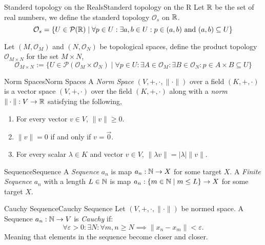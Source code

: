 \documentclass{article}
\newcommand{\tp}{\mathcal{O}}
\newcommand{\pset}[1]{\mathcal{P}(#1)}
\begin{document}
\begin{example}{Standerd topology on the Reals}{Standerd topology on the R}
    Let $\mathbb{R}$ be the set of real numbers, we define the standerd topology $\tp_s$ on $\mathbb{R}$.
    $$\tp_s = \{U \in \pset{\R} \mid \forall p  \in U : \exists a, b \in U : p \in (a,b) \tand (a,b) \subseteq U\}$$
\end{example}

\begin{definition}{}{}
    Let $(M, \tp_M)$ and $(N, \tp_N)$ be topological spaces, define the product topology $\tp_{M \times N}$ for the set $M \times N$,
    $$\tp_{M \times N}  := \{U \in \pset{\tp_M \times \tp_N} \mid \forall p \in U : \exists A \in \tp_M : \exists B \in \tp_N : p \in A \times B \subseteq U\}$$
\end{definition}



\begin{definition}{Norm Spaces}{Norm Spaces}
    A \emph{Norm Space} $\left(V, +, \cdot, \|\cdot\|\right)$ over a field $\left(K, +, \cdot\right)$
    is a vector space $\left(V, +, \cdot\right)$ over the field $\left(K, +, \cdot\right)$ along with a \emph{norm} $\|\cdot\| : V \to \mathbb{R}$  satisfying the following,

    \begin{enumerate}[label=(\roman*)]
        \item For every vector $v \in V$, $\|v\| \geq 0$.
        \item $\|v\| = 0$ if and only if $v = \vec{0}$.
        \item For every scalar $\lambda \in K$ and vector $v \in V$, $\|\lambda v\| = |\lambda|\|v\|$.
    \end{enumerate}
\end{definition}

\begin{definition}{Sequence}{Sequence}
    A \emph{Sequence} $a_n$ is map $a_n : \mathbb{N} \to X$ for some target $X$.
    A \emph{Finite Sequence} $a_n$ with a length $L \in \mathbb{N}$ is map $a_n : \{m \in \mathbb{N} \mid m \leq L\} \to X$ for some target $X$.
\end{definition}

\begin{definition}{Cauchy Sequence}{Cauchy Sequence}
    Let $\left(V, +, \cdot, \|\cdot\|\right)$ be normed space.
    A Sequence $a_n: \mathbb{N} \to V$ is \emph{Cauchy} if:
    $$\forall \varepsilon > 0 : \exists N : \forall m, n \geq N \implies \|x_n - x_m\| < \varepsilon.$$
    Meaning that elements in the sequence become closer and closer.
\end{definition}
\end{document}
